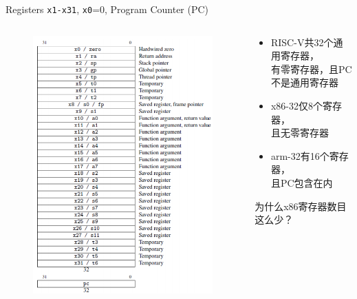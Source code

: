 \documentclass{myslide}
\begin{document}
\begin{frame}[fragile]{Registers}
\verb'x1-x31', \verb'x0'=0, Program Counter (PC)
\begin{columns}
\begin{column}{0.35\linewidth}
\begin{figure}
\centering
\includegraphics[width=\linewidth]{fig/Lecture2/general_registers.PNG}
\end{figure}
\end{column}
\begin{column}{0.55\linewidth}
\begin{itemize}
	\item RISC-V共32个通用寄存器，\\有零寄存器，且PC不是通用寄存器
	\item x86-32仅8个寄存器，\\且无零寄存器
	\item arm-32有16个寄存器，\\且PC包含在内
\end{itemize}
为什么x86寄存器数目这么少？
\end{column}
\end{columns}
\end{frame}
\end{document}
